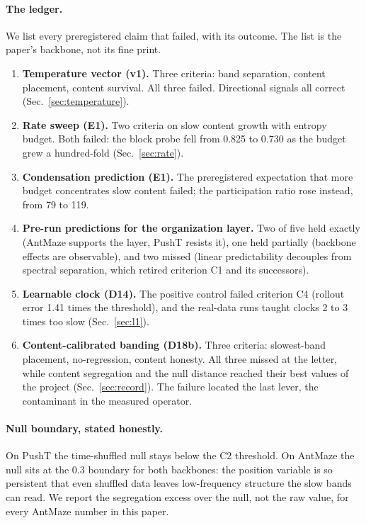 \documentclass[11pt]{article}
\newcommand{\term}[1]{\textbf{#1}}
\begin{document}
\paragraph{The ledger.}
We list every preregistered claim that failed, with its outcome.
The list is the paper's backbone, not its fine print.
\begin{enumerate}
\item \term{Temperature vector (v1).} Three criteria: band separation, content placement, content survival. All three failed. Directional signals all correct (Sec.~\ref{sec:temperature}).
\item \term{Rate sweep (E1).} Two criteria on slow content growth with entropy budget. Both failed: the block probe fell from 0.825 to 0.730 as the budget grew a hundred-fold (Sec.~\ref{sec:rate}).
\item \term{Condensation prediction (E1).} The preregistered expectation that more budget concentrates slow content failed; the participation ratio rose instead, from 79 to 119.
\item \term{Pre-run predictions for the organization layer.} Two of five held exactly (AntMaze supports the layer, PushT resists it), one held partially (backbone effects are observable), and two missed (linear predictability decouples from spectral separation, which retired criterion C1 and its successors).
\item \term{Learnable clock (D14).} The positive control failed criterion C4 (rollout error 1.41 times the threshold), and the real-data runs taught clocks 2 to 3 times too slow (Sec.~\ref{sec:l1}).
\item \term{Content-calibrated banding (D18b).} Three criteria: slowest-band placement, no-regression, content honesty. All three missed at the letter, while content segregation and the null distance reached their best values of the project (Sec.~\ref{sec:record}). The failure located the last lever, the contaminant in the measured operator.
\end{enumerate}

\paragraph{Null boundary, stated honestly.}
On PushT the time-shuffled null stays below the C2 threshold.
On AntMaze the null sits at the 0.3 boundary for both backbones: the position variable is so persistent that even shuffled data leaves low-frequency structure the slow bands can read.
We report the segregation excess over the null, not the raw value, for every AntMaze number in this paper.
\end{document}

